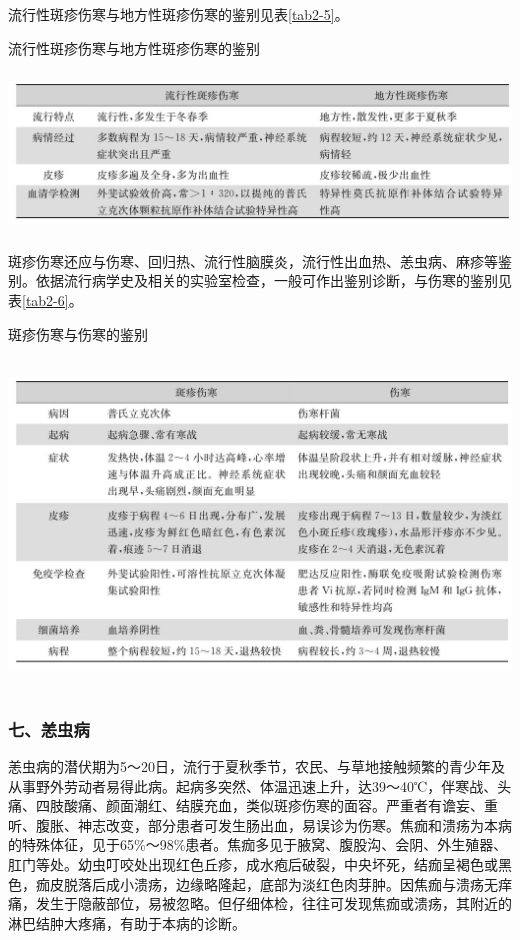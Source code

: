 流行性斑疹伤寒与地方性斑疹伤寒的鉴别见表\ref{tab2-5}。

\begin{table}[htbp]
\centering
\caption{流行性斑疹伤寒与地方性斑疹伤寒的鉴别}
\label{tab2-5}
\includegraphics[width=5.94792in,height=1.67708in]{./images/Image00009.jpg}
\end{table}

斑疹伤寒还应与伤寒、回归热、流行性脑膜炎，流行性出血热、恙虫病、麻疹等鉴别。依据流行病学史及相关的实验室检查，一般可作出鉴别诊断，与伤寒的鉴别见表\ref{tab2-6}。

\begin{table}[htbp]
\centering
\caption{斑疹伤寒与伤寒的鉴别}
\label{tab2-6}
\includegraphics[width=5.95833in,height=3.45833in]{./images/Image00010.jpg}
\end{table}

\subsubsection{七、恙虫病}

恙虫病的潜伏期为5～20日，流行于夏秋季节，农民、与草地接触频繁的青少年及从事野外劳动者易得此病。起病多突然、体温迅速上升，达39～40℃，伴寒战、头痛、四肢酸痛、颜面潮红、结膜充血，类似斑疹伤寒的面容。严重者有谵妄、重听、腹胀、神志改变，部分患者可发生肠出血，易误诊为伤寒。焦痂和溃疡为本病的特殊体征，见于65\%～98\%患者。焦痂多见于腋窝、腹股沟、会阴、外生殖器、肛门等处。幼虫叮咬处出现红色丘疹，成水疱后破裂，中央坏死，结痂呈褐色或黑色，痂皮脱落后成小溃疡，边缘略隆起，底部为淡红色肉芽肿。因焦痂与溃疡无痒痛，发生于隐蔽部位，易被忽略。但仔细体检，往往可发现焦痂或溃疡，其附近的淋巴结肿大疼痛，有助于本病的诊断。

